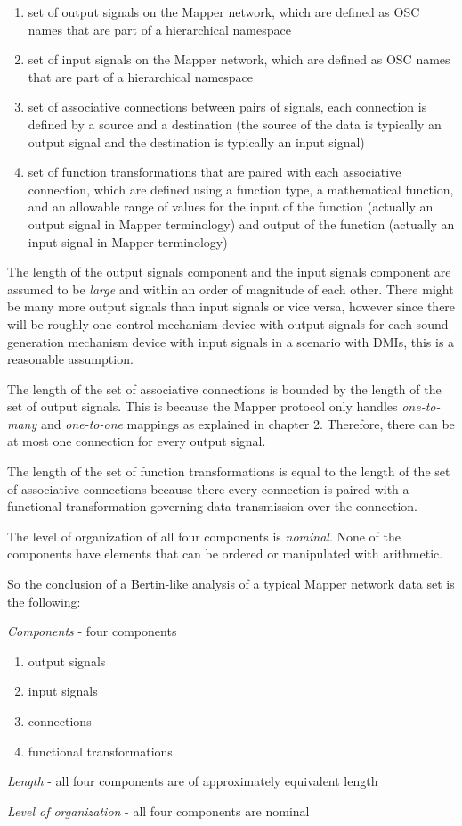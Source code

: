 \begin{enumerate}
\item set of output signals on the Mapper network, which are defined as OSC names that are part of a hierarchical namespace
\item set of input signals on the Mapper network, which are defined as OSC names that are part of a hierarchical namespace
\item set of associative connections between pairs of signals, each connection is defined by a source and a destination (the source of the data is typically an output signal and the destination is typically an input signal)
\item set of function transformations that are paired with each associative connection, which are defined using a function type, a mathematical function, and an allowable range of values for the input of the function (actually an output signal in Mapper terminology) and output of the function (actually an input signal in Mapper terminology)
\end{enumerate}

The length of the output signals component and the input signals component are assumed to be \emph{large} and within an order of magnitude of each other. There might be many more output signals than input signals or vice versa, however since there will be roughly one control mechanism device with output signals for each sound generation mechanism device with input signals in a scenario with DMIs, this is a reasonable assumption.

The length of the set of associative connections is bounded by the length of the set of output signals. This is because the Mapper protocol only handles \emph{one-to-many} and \emph{one-to-one} mappings as explained in chapter 2. Therefore, there can be at most one connection for every output signal.

The length of the set of function transformations is equal to the length of the set of associative connections because there every connection is paired with a functional transformation governing data transmission over the connection.

The level of organization of all four components is \emph{nominal}. None of the components have elements that can be ordered or manipulated with arithmetic.

So the conclusion of a Bertin-like analysis of a typical Mapper network data set is the following:
\begin{description}
\item \emph{Components} - four components
    \begin{enumerate}
        \item output signals
        \item input signals
        \item connections
        \item functional transformations
    \end{enumerate}
\item \emph{Length} - all four components are of approximately equivalent length
\item \emph{Level of organization} - all four components are nominal
\end{description}

